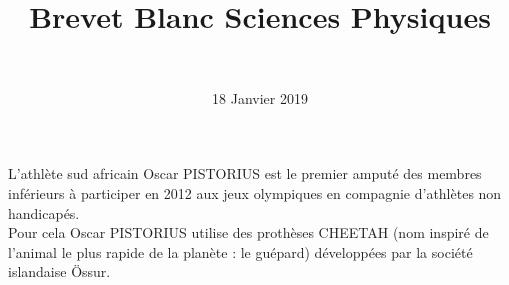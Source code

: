 \documentclass[a4paper,12pt]{exam}
\author{\ }
\date{18 Janvier 2019}
\title{Brevet Blanc Sciences Physiques}
\begin{document}
%	


	
L'athlète sud africain Oscar PISTORIUS est le premier amputé des membres inférieurs à participer en 2012 aux jeux olympiques en compagnie d'athlètes non handicapés.\\

Pour cela Oscar PISTORIUS  utilise des prothèses CHEETAH (nom inspiré de l'animal le plus rapide de la planète : le guépard) développées par la société islandaise \"{O}ssur.
	
	
\vspace*{1cm}	

	




	




\end{document}
